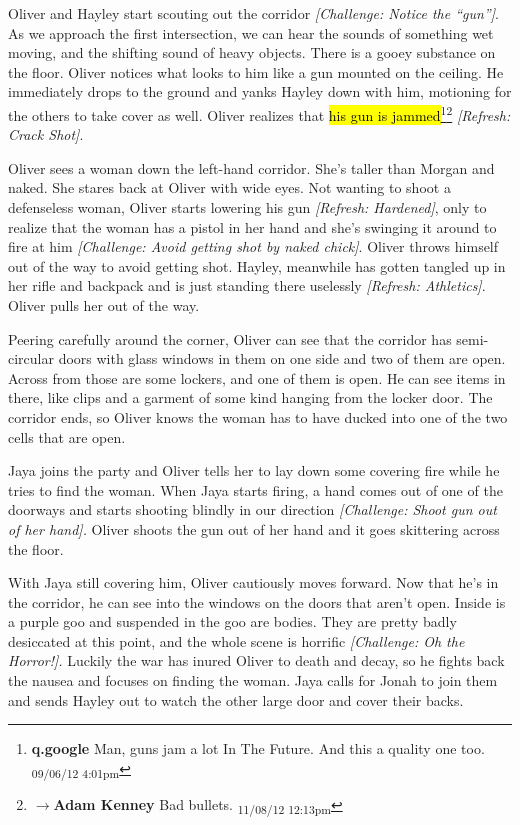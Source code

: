 Oliver and Hayley start scouting out the corridor \textit{{[}Challenge: Notice the ``gun''{]}}.  As we approach the first intersection, we can hear the sounds of something wet moving, and the shifting sound of heavy objects.  There is a gooey substance on the floor.  Oliver notices what looks to him like a gun mounted on the ceiling.  He immediately drops to the ground and yanks Hayley down with him, motioning for the others to take cover as well.  Oliver realizes that \hl{his gun is jammed}\footnote{\textbf{q.google }Man, guns jam a lot In The Future.  And this a quality one too. \textsubscript{09/06/12 4:01pm}}\footnote{$\rightarrow$\textbf{Adam Kenney }Bad bullets. \textsubscript{11/08/12 12:13pm}} \textit{{[}Refresh: Crack Shot{]}}.



Oliver sees a woman down the left-hand corridor.  She's taller than Morgan and naked.  She stares back at Oliver with wide eyes.  Not wanting to shoot a defenseless woman, Oliver starts lowering his gun \textit{{[}Refresh: Hardened{]}}, only to realize that the woman has a pistol in her hand and she's swinging it around to fire at him\textit{ {[}Challenge: Avoid getting shot by naked chick{]}}.  Oliver throws himself out of the way to avoid getting shot.  Hayley, meanwhile has gotten tangled up in her rifle and backpack and is just standing there uselessly \textit{{[}Refresh: Athletics{]}}.  Oliver pulls her out of the way.



Peering carefully around the corner, Oliver can see that the corridor has semi-circular doors with glass windows in them on one side and two of them are open.  Across from those are some lockers, and one of them is open.  He can see items in there, like clips and a garment of some kind hanging from the locker door.  The corridor ends, so Oliver knows the woman has to have ducked into one of the two cells that are open.



Jaya joins the party and Oliver tells her to lay down some covering fire while he tries to find the woman.  When Jaya starts firing, a hand comes out of one of the doorways and starts shooting blindly in our direction \textit{{[}Challenge: Shoot gun out of her hand{]}.}  Oliver shoots the gun out of her hand and it goes skittering across the floor.



With Jaya still covering him, Oliver cautiously moves forward.  Now that he's in the corridor, he can see into the windows on the doors that aren't open.  Inside is a purple goo and suspended in the goo are bodies.  They are pretty badly desiccated at this point, and the whole scene is horrific \textit{{[}Challenge: Oh the Horror!{]}.}  Luckily the war has inured Oliver to death and decay, so he fights back the nausea and focuses on finding the woman.  Jaya calls for Jonah to join them and sends Hayley out to watch the other large door and cover their backs.



